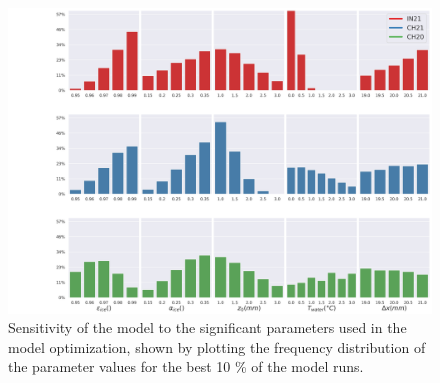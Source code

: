 \documentclass[utf8]{frontiersSCNS} %
\begin{document}
\begin{figure}
	\begin{center}
		\includegraphics[width=\linewidth]{Figures/param_hist.jpg}
	\end{center}
	\caption{Sensitivity of the model to the significant parameters used in the model optimization, shown by plotting the frequency
		distribution of the parameter values for the best 10 \% of the model runs. } \label{fig:param_hist} \end{figure}


\end{document}
